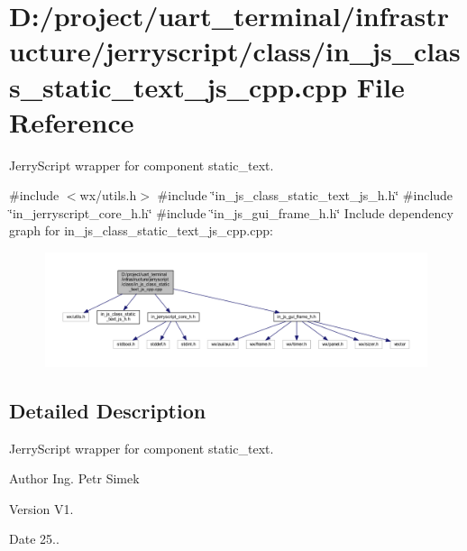 \section{D\+:/project/uart\+\_\+terminal/infrastructure/jerryscript/class/in\+\_\+js\+\_\+class\+\_\+static\+\_\+text\+\_\+js\+\_\+cpp.cpp File Reference}
\label{in__js__class__static__text__js__cpp_8cpp}


Jerry\+Script wrapper for component static\+\_\+text.  


{\ttfamily \#include $<$wx/utils.\+h$>$}\newline
{\ttfamily \#include \char`\"{}in\+\_\+js\+\_\+class\+\_\+static\+\_\+text\+\_\+js\+\_\+h.\+h\char`\"{}}\newline
{\ttfamily \#include \char`\"{}in\+\_\+jerryscript\+\_\+core\+\_\+h.\+h\char`\"{}}\newline
{\ttfamily \#include \char`\"{}in\+\_\+js\+\_\+gui\+\_\+frame\+\_\+h.\+h\char`\"{}}\newline
Include dependency graph for in\+\_\+js\+\_\+class\+\_\+static\+\_\+text\+\_\+js\+\_\+cpp.\+cpp\+:
\nopagebreak
\begin{figure}[H]
\begin{center}
\leavevmode
\includegraphics[width=350pt]{in__js__class__static__text__js__cpp_8cpp__incl}
\end{center}
\end{figure}


\subsection{Detailed Description}
Jerry\+Script wrapper for component static\+\_\+text. 

\begin{DoxyAuthor}{Author}
Ing. Petr Simek 
\end{DoxyAuthor}
\begin{DoxyVersion}{Version}
V1. 
\end{DoxyVersion}
\begin{DoxyDate}{Date}
25.. 
\end{DoxyDate}
